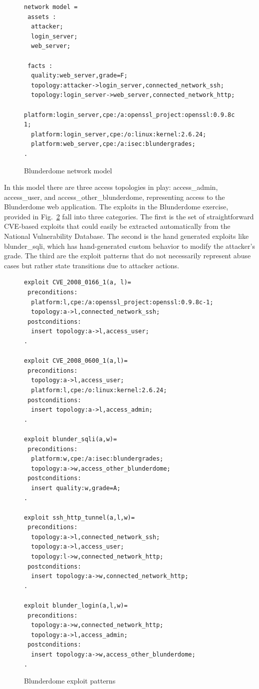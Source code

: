 \begin{figure}
\begin{lstlisting}
network model = 
 assets :
  attacker;
  login_server;
  web_server;
    
 facts :
  quality:web_server,grade=F;
  topology:attacker->login_server,connected_network_ssh;
  topology:login_server->web_server,connected_network_http;
  platform:login_server,cpe:/a:openssl_project:openssl:0.9.8c-1;
  platform:login_server,cpe:/o:linux:kernel:2.6.24;
  platform:web_server,cpe:/a:isec:blundergrades;
.
\end{lstlisting}
\caption{Blunderdome network model}
\label{fig:blunder_nm}
\end{figure}

In this model there are three access topologies in play: access\_admin,
access\_user, and access\_other\_blunderdome, representing access to the 
Blunderdome web application.
The exploits in the Blunderdome exercise, provided in Fig.~\ref{fig:blunder_xp}
fall into three categories. The first is the set of straightforward CVE-based exploits
that could easily be extracted automatically from the National Vulnerability
Database. The second is the hand generated exploits like blunder\_sqli, which
has hand-generated custom behavior to modify the attacker's grade. The third
are the exploit patterns that do not necessarily represent abuse cases 
but rather state transitions due to attacker actions.

\begin{figure}
\begin{lstlisting}
exploit CVE_2008_0166_1(a, l)=
 preconditions:
  platform:l,cpe:/a:openssl_project:openssl:0.9.8c-1;
  topology:a->l,connected_network_ssh;
 postconditions:
  insert topology:a->l,access_user;
.

exploit CVE_2008_0600_1(a,l)=
 preconditions:
  topology:a->l,access_user;
  platform:l,cpe:/o:linux:kernel:2.6.24;
 postconditions:
  insert topology:a->l,access_admin;
.

exploit blunder_sqli(a,w)=
 preconditions:
  platform:w,cpe:/a:isec:blundergrades;
  topology:a->w,access_other_blunderdome;
 postconditions:
  insert quality:w,grade=A;
.

exploit ssh_http_tunnel(a,l,w)=
 preconditions:
  topology:a->l,connected_network_ssh;
  topology:a->l,access_user;
  topology:l->w,connected_network_http;
 postconditions:
  insert topology:a->w,connected_network_http;
.

exploit blunder_login(a,l,w)=
 preconditions:
  topology:a->w,connected_network_http;
  topology:a->l,access_admin;
 postconditions:
  insert topology:a->w,access_other_blunderdome;
.
\end{lstlisting}
\caption{Blunderdome exploit patterns}
\label{fig:blunder_xp}
\end{figure}

